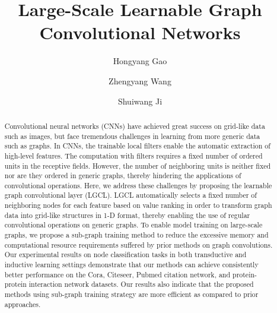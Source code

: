 \documentclass[sigconf]{acmart}
\begin{document}
\title{Large-Scale Learnable Graph Convolutional Networks}


\author{Hongyang Gao}

\author{Zhengyang Wang}

\author{Shuiwang Ji}

\renewcommand{\shortauthors}{H. Gao et al.}




\begin{abstract} Convolutional neural networks (CNNs) have achieved great
success on grid-like data such as images, but face tremendous challenges in
learning from more generic data such as graphs. In CNNs, the trainable local
filters enable the automatic extraction of high-level features. The
computation with filters requires a fixed number of ordered units in the
receptive fields. However, the number of neighboring units is neither fixed
nor are they ordered in generic graphs, thereby hindering the applications of
convolutional operations. Here, we address these challenges by proposing the
learnable graph convolutional layer (LGCL). LGCL automatically selects a fixed
number of neighboring nodes for each feature based on value ranking in order
to transform graph data into grid-like structures in 1-D format, thereby
enabling the use of regular convolutional operations on generic graphs. To
enable model training on large-scale graphs, we propose a sub-graph training
method to reduce the excessive memory and computational resource requirements
suffered by prior methods on graph convolutions. Our experimental results on
node classification tasks in both transductive and inductive learning settings
demonstrate that our methods can achieve consistently better performance on
the Cora, Citeseer, Pubmed citation network, and protein-protein interaction
network datasets. Our results also indicate that the proposed methods using
sub-graph training strategy are more efficient as compared to prior
approaches. \end{abstract}
\end{document}
